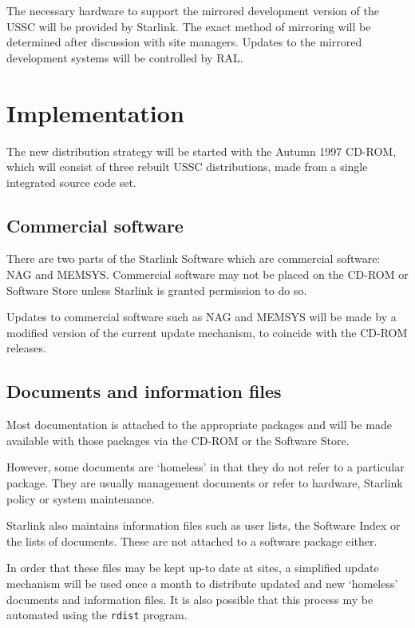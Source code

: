 \documentclass[twoside,11pt]{article}
\newcommand{\xlabel}[1]{}
\begin{document}
The necessary hardware to support the mirrored development version of the
USSC will be provided by Starlink.  The exact method of mirroring will be
determined after discussion with site managers.  Updates to the mirrored
development systems will be controlled by RAL.

\section{\label{implementation}\xlabel{implementation}Implementation}

The new distribution strategy will be started with the Autumn 1997 CD-ROM, which
will consist of three rebuilt USSC distributions, made from a single
integrated source code set.

\subsection{\label{commercial_software}\xlabel{commercial_software}Commercial software}

There are two parts of the Starlink Software which are commercial
software: NAG and MEMSYS\@.  Commercial software may not be placed on
the CD-ROM or Software Store unless Starlink is granted permission to
do so.

Updates to commercial software such as NAG and MEMSYS will be made by a
modified version of the current  update mechanism, to coincide with the
CD-ROM releases.

\subsection{\label{documents_and_information_files}\xlabel{documents_and_information_files}Documents and information files}

Most documentation is attached to the appropriate packages and will be
made available with those packages via the CD-ROM or the Software Store.

However, some documents are `homeless' in that they do not refer to a
particular package.  They are usually management documents or refer to
hardware, Starlink policy or system maintenance.

Starlink also maintains information files such as user lists, the
Software Index or the lists of documents.  These are not attached to a
software package either.

In order that these files may be kept up-to date at sites, a simplified
update mechanism will be used once a month to distribute updated
and new `homeless' documents and information files.  It is also possible
that this process my be automated using the \texttt{rdist} program.
\end{document}
